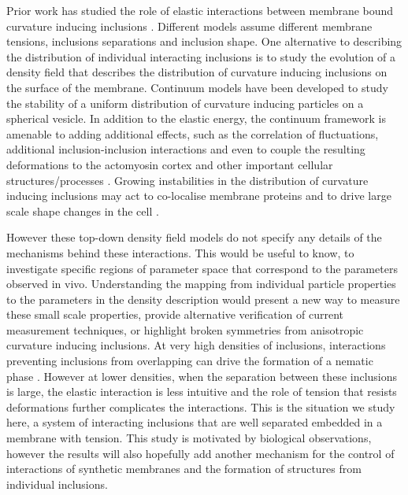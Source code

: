 Prior work has studied the role of elastic interactions between membrane bound curvature inducing inclusions \cite{argudo_continuum_2016, helfrich_elastic_1973, kim_curvature-mediated_1998, brown_elastic_2008}. Different models assume different membrane tensions, inclusions separations and inclusion shape. One alternative to describing the distribution of individual interacting inclusions is to study the evolution of a density field that describes the distribution of curvature inducing inclusions on the surface of the membrane. Continuum models \cite{agudo-canalejo_pattern_2017} have been developed to study the stability of a uniform distribution of curvature inducing particles on a spherical vesicle. In addition to the elastic energy, the continuum framework is amenable to adding additional effects, such as the correlation of fluctuations, additional inclusion-inclusion interactions and even to couple the resulting deformations to the actomyosin cortex and other important cellular structures/processes \cite{ghosh_pattern_2021}. Growing instabilities in the distribution of curvature inducing inclusions may act to co-localise membrane proteins and to drive large scale shape changes in the cell \cite{garcia-lara_supramolecular_2015}.

However these top-down density field models do not specify any details of the mechanisms behind these interactions. This would be useful to know, to investigate specific regions of parameter space that correspond to the parameters observed in vivo. Understanding the mapping from individual particle properties to the parameters in the density description would present a new way to measure these small scale properties, provide alternative verification of current measurement techniques, or highlight broken symmetries from anisotropic curvature inducing inclusions. At very high densities of inclusions, interactions preventing inclusions from overlapping can drive the formation of a nematic phase \cite{tozzi_theory_2021}. However at lower densities, when the separation between these inclusions is large, the elastic interaction is less intuitive and the role of tension that resists deformations further complicates the interactions. This is the situation we study here, a system of interacting inclusions that are well separated embedded in a membrane with tension. This study is motivated by biological observations, however the results will also hopefully add another mechanism for the control of interactions of synthetic membranes and the formation of structures from individual inclusions.

